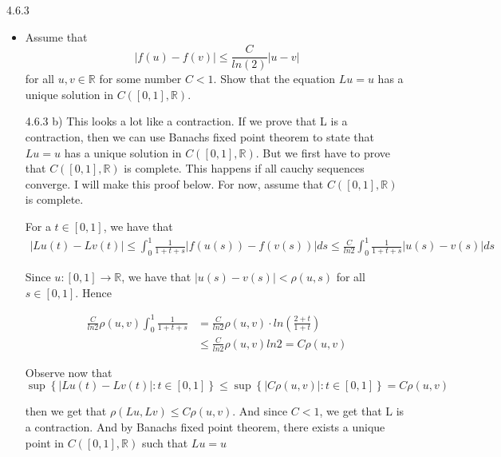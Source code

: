 \documentclass[a4paper,norsk]{article}
\renewcommand{\leq}{\leqslant}
\begin{document}
\begin{oppgavebox}{4.6.3}{}
\begin{itemize}
  \item Assume that 
  \[
      \left| f(u) - f(v) \right| \leq \frac{ C }{ ln (2) } \left| u - v \right| 
  \]
  for all $ u, v \in \mathbb{R} $ for some number $ C < 1 $. Show that the equation $ Lu = u $ has a unique solution in $ C \left( \left[ 0, 1 \right] , \mathbb{R} \right)  $.
  \begin{proofbox}{4.6.3 b)}{}
    This looks a lot like a contraction. If we prove that L is a contraction, then we can use Banachs fixed point theorem to state that $ Lu=u $ has a unique solution in $ C \left( \left[ 0, 1 \right] , \mathbb{R} \right)  $. But we first have to prove that $ C \left( \left[ 0, 1 \right] , \mathbb{R} \right)  $ is complete. This happens if all cauchy sequences converge. I will make this proof below. For now, assume that $ C \left( \left[ 0, 1  \right] , \mathbb{R} \right)  $ is complete. 
    
    
    For a $ t \in \left[ 0, 1 \right]  $, we have that 
    \begin{align*}
      \left| Lu(t) - Lv(t) \right| \leq \int_{0}^{1} \frac{ 1 }{ 1+t+s } \left| f(u(s))-f(v(s)) \right| ds \leq  \frac{ C }{ ln2 } \int_{0}^{1} \frac{ 1 }{ 1+t+s } \left| u(s) - v(s) \right| ds   
    \end{align*}

    Since $ u: \left[ 0, 1 \right] \to \mathbb{R} $, we have that  $ \left| u(s) - v(s)  \right| < \rho \left( u, s \right)   $ for all $ s \in \left[ 0, 1 \right]  $. Hence
    
    \begin{align*}
      \frac{ C }{ ln2 }  \rho \left( u, v \right) \int_{0}^{1} \frac{ 1 }{ 1+t+s }&= 
      \frac{ C }{ ln2 } \rho \left( u, v \right) \cdot ln \left( \frac{ 2+t }{ 1+t  } \right) \\
      & \leq \frac{ C }{ ln2 } \rho \left( u, v \right) ln2 = C \rho \left( u, v \right)   
    \end{align*}
    
    Observe now that \[
        \sup \left\{ \left| Lu(t) - Lv(t) \right| : t \in \left[ 0, 1 \right]  \right\} \leq  \sup \left\{ \left| C \rho \left( u, v \right)  \right| : t \in \left[ 0, 1 \right]   \right\} =   C \rho \left( u, v \right) 
    \]

    then we get that $ \rho \left( Lu, Lv \right) \leq C \rho \left( u, v \right)  $. And since $ C < 1 $, we get that L is a contraction. And by Banachs fixed point theorem, there exists a unique point in $ C \left( \left[ 0, 1 \right] , \mathbb{R} \right)  $ such that $ Lu=u $   
  \end{proofbox}
\end{itemize}

\end{oppgavebox}
\end{document}
